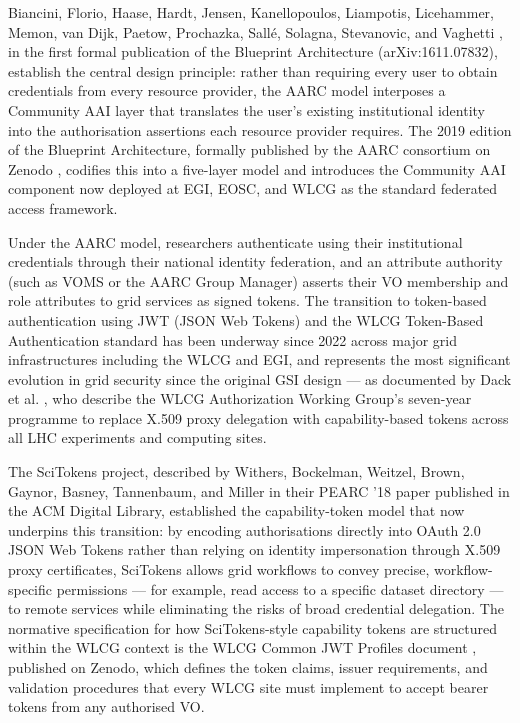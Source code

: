 \documentclass[12pt,a4paper]{report}
\begin{document}
 Biancini, 
 Florio, Haase, Hardt, Jensen, Kanellopoulos, Liampotis, Licehammer, Memon, van Dijk, Paetow, Prochazka, Sallé, Solagna, Stevanovic, and Vaghetti \parencite{biancini2016aarc},
  in the first formal publication of the Blueprint Architecture (arXiv:1611.07832), establish the central design principle: rather than requiring every 
  user to obtain credentials from every resource provider, the AARC model interposes a Community AAI layer that translates the user’s existing institutional 
  identity into the authorisation assertions each resource provider requires. The 2019 edition of the Blueprint Architecture, formally published by 
  the AARC consortium on Zenodo \parencite{aarc2019blueprint}, codifies this into a five-layer model and introduces the Community AAI component now deployed at EGI, 
  EOSC, and WLCG as the standard federated access framework.

Under the AARC model, researchers authenticate using their institutional credentials through their national identity federation, and an attribute 
authority (such as VOMS or the AARC Group Manager) asserts their VO membership and role attributes to grid services as signed tokens. The transition 
to token-based authentication using JWT (JSON Web Tokens) and the WLCG Token-Based Authentication standard has been underway since 2022 across major 
grid infrastructures including the WLCG and EGI, and represents the most significant evolution in grid security since the original GSI design — as 
documented by Dack et al. \parencite{dack2024wlcg}, who describe the WLCG Authorization Working Group’s seven-year programme to replace X.509 proxy delegation with 
capability-based tokens across all LHC experiments and computing sites. 

The SciTokens project, described by Withers, Bockelman, Weitzel, Brown, 
Gaynor, Basney, Tannenbaum, and Miller \parencite{withers2018scitokens} in their PEARC ’18 paper published in the ACM Digital Library, established the capability-token model 
that now underpins this transition: by encoding authorisations directly into OAuth 2.0 JSON Web Tokens rather than relying on identity impersonation 
through X.509 proxy certificates, SciTokens allows grid workflows to convey precise, workflow-specific permissions — for example, read access to a 
specific dataset directory — to remote services while eliminating the risks of broad credential delegation. The normative specification for how 
SciTokens-style capability tokens are structured within the WLCG context is the WLCG Common JWT Profiles document \parencite{altunay2019wlcg}, published on Zenodo, which defines the token claims, issuer requirements, and validation procedures that every WLCG
 site must implement to accept bearer tokens from any authorised VO.
\end{document}
